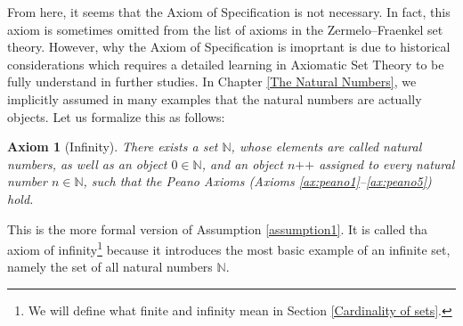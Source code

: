 \documentclass[a4paper]{book}
\theoremstyle{break}
\newtheorem{axiom}{Axiom}[chapter]
\begin{document}
			From here, it seems that the Axiom of Specification is not necessary. In fact, this axiom is sometimes omitted from the list of axioms in the Zermelo–Fraenkel set theory. However, why the Axiom of Specification is imoprtant is due to historical considerations which requires a detailed learning in Axiomatic Set Theory to be fully understand in further studies.
			In Chapter \ref{The Natural Numbers}, we implicitly assumed in many examples that the natural numbers are actually objects. Let us formalize this as follows:
			\begin{axiom}[Infinity]
				There exists a set $\mathbb{N}$, whose elements are called natural numbers, as well as an object $0\in\mathbb{N}$, and an object $n\texttt{++}$ assigned to every natural number $n\in\mathbb{N}$, such that the Peano Axioms (Axioms \ref{ax:peano1}--\ref{ax:peano5}) hold.
			\end{axiom}
			This is the more formal version of Assumption \ref{assumption1}. It is called tha axiom of infinity\footnote{We will define what finite and infinity mean in Section \ref{Cardinality of sets}.} because it introduces the most basic example of an infinite set, namely the set of all natural numbers $\mathbb{N}$.
\end{document}
